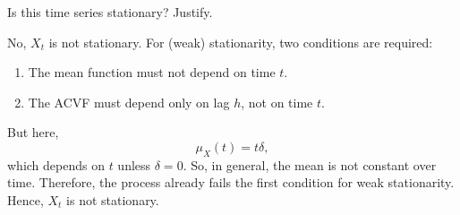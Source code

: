 \documentclass[
  10pt,
]{extarticle}
\providecommand{\tightlist}{%
  \setlength{\itemsep}{0pt}\setlength{\parskip}{0pt}}
\begin{document}
\begin{problem}[Problem 1 (d)]
Is this time series stationary? Justify.
\end{problem}

No, \(X_t\) is not stationary. For (weak) stationarity, two conditions are required:

\begin{enumerate}
\def\labelenumi{\arabic{enumi}.}
\tightlist
\item
  The mean function must not depend on time \(t\).
\item
  The ACVF must depend only on lag \(h\), not on time \(t\).
\end{enumerate}

But here,
\[
\mu_X(t) = t\delta,
\]
which depends on \(t\) unless \(\delta=0\). So, in general, the mean is not constant over time. Therefore, the process already fails the first condition for weak stationarity. Hence, \(X_t\) is not stationary.
\end{document}

